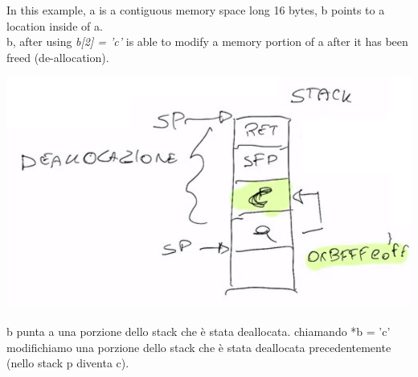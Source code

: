 \documentclass[11pt, oneside]{article}   	%
\begin{document}
In this example, a is a contiguous memory space long 16 bytes, b points to a location inside of a.\\
b, after using \emph{b[2] = 'c'} is able to modify a memory portion of a after it has been freed (de-allocation).
\begin{center}
\includegraphics[scale = 0.6]{usafter2}
\end{center}
b punta a una porzione dello stack che è stata deallocata. chiamando *b = 'c' modifichiamo una porzione dello stack che è stata deallocata precedentemente (nello stack p diventa c).
\end{document}
